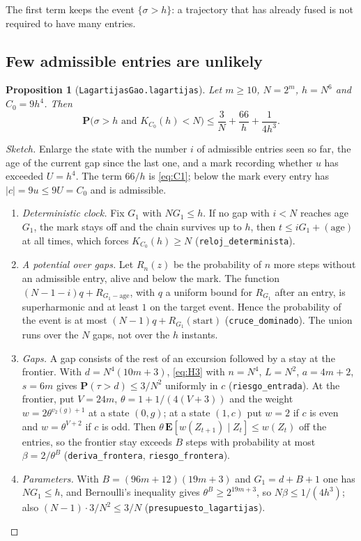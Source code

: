 \documentclass[11pt]{amsart}
\newtheorem{proposition}[theorem]{Proposition}
\theoremstyle{definition}
\theoremstyle{remark}
\newcommand{\Prob}{\mathbf{P}}
\newcommand{\E}{\mathbf{E}}
\newcommand{\lean}[1]{\nolinkurl{#1}}
\begin{document}
The first term keeps the event $\{\sigma>h\}$: a trajectory that has already fused is not required to have many entries.

\subsection{Few admissible entries are unlikely}

\begin{proposition}[\lean{LagartijasGao.lagartijas}]\label{prop:lagartijas}
Let $m\ge10$, $N=2^m$, $h=N^6$ and $C_0=9h^4$. Then
\[
\Prob\bigl(\sigma>h \text{ and } K_{C_0}(h)<N\bigr)\le \frac3N+\frac{66}{h}+\frac1{4h^3}.
\]
\end{proposition}

\begin{proof}[Sketch]
Enlarge the state with the number $i$ of admissible entries seen so far, the age of the current gap since the last one, and a mark recording whether $u$ has exceeded $U=h^4$. The term $66/h$ is \eqref{eq:C1}; below the mark every entry has $|c|=9u\le 9U=C_0$ and is admissible.
\begin{enumerate}
\item \emph{Deterministic clock.} Fix $G_1$ with $NG_1\le h$. If no gap with $i<N$ reaches age $G_1$, the mark stays off and the chain survives up to $h$, then $t\le iG_1+(\text{age})$ at all times, which forces $K_{C_0}(h)\ge N$ (\lean{reloj_determinista}).
\item \emph{A potential over gaps.} Let $R_n(z)$ be the probability of $n$ more steps without an admissible entry, alive and below the mark. The function $(N-1-i)q+R_{G_1-\text{age}}$, with $q$ a uniform bound for $R_{G_1}$ after an entry, is superharmonic and at least $1$ on the target event. Hence the probability of the event is at most $(N-1)q+R_{G_1}(\text{start})$ (\lean{cruce_dominado}). The union runs over the $N$ gaps, not over the $h$ instants.
\item \emph{Gaps.} A gap consists of the rest of an excursion followed by a stay at the frontier. With $d=N^4(10m+3)$, \eqref{eq:H3} with $n=N^4$, $L=N^2$, $a=4m+2$, $s=6m$ gives $\Prob(\tau>d)\le 3/N^2$ uniformly in $c$ (\lean{riesgo_entrada}). At the frontier, put $V=24m$, $\theta=1+1/(4(V+3))$ and the weight $w=2\theta^{v_2(g)+1}$ at a state $(0,g)$; at a state $(1,c)$ put $w=2$ if $c$ is even and $w=\theta^{V+2}$ if $c$ is odd. Then $\theta\,\E[w(Z_{t+1})\mid Z_t]\le w(Z_t)$ off the entries, so the frontier stay exceeds $B$ steps with probability at most $\beta=2/\theta^{B}$ (\lean{deriva_frontera}, \lean{riesgo_frontera}).
\item \emph{Parameters.} With $B=(96m+12)(19m+3)$ and $G_1=d+B+1$ one has $NG_1\le h$, and Bernoulli's inequality gives $\theta^B\ge 2^{19m+3}$, so $N\beta\le 1/(4h^3)$; also $(N-1)\cdot 3/N^2\le 3/N$ (\lean{presupuesto_lagartijas}).
\end{enumerate}
\end{proof}
\end{document}
